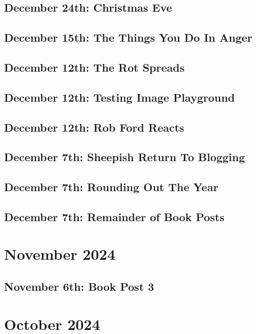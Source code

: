 \documentclass[12pt,letterpaper]{report}
\begin{document}
\subsection{December 24th: Christmas Eve}


\subsection{December 15th: The Things You Do In Anger}

\subsection{December 12th: The Rot Spreads}

\subsection{December 12th: Testing Image Playground}

\subsection{December 12th: Rob Ford Reacts}

\subsection{December 7th: Sheepish Return To Blogging}

\subsection{December 7th: Rounding Out The Year}

\subsection{December 7th: Remainder of Book Posts}

\section{November 2024}
\subsection{November 6th: Book Post 3}

\section{October 2024}
\end{document}
